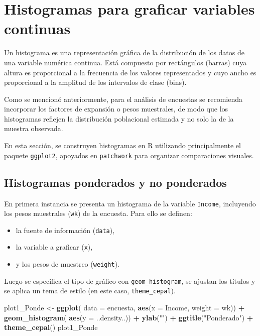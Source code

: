 \documentclass[
  12pt,
]{book}
\newenvironment{Shaded}{\begin{snugshade}}{\end{snugshade}}
\newcommand{\AttributeTok}[1]{\textcolor[rgb]{0.13,0.29,0.53}{#1}}
\newcommand{\FunctionTok}[1]{\textcolor[rgb]{0.13,0.29,0.53}{\textbf{#1}}}
\newcommand{\NormalTok}[1]{#1}
\newcommand{\OtherTok}[1]{\textcolor[rgb]{0.56,0.35,0.01}{#1}}
\newcommand{\SpecialCharTok}[1]{\textcolor[rgb]{0.81,0.36,0.00}{\textbf{#1}}}
\newcommand{\StringTok}[1]{\textcolor[rgb]{0.31,0.60,0.02}{#1}}
\providecommand{\tightlist}{%
  \setlength{\itemsep}{0pt}\setlength{\parskip}{0pt}}
\begin{document}
\section{Histogramas para graficar variables continuas}\label{histogramas-para-graficar-variables-continuas}

Un histograma es una representación gráfica de la distribución de los datos de una variable numérica continua. Está compuesto por rectángulos (barras) cuya altura es proporcional a la frecuencia de los valores representados y cuyo ancho es proporcional a la amplitud de los intervalos de clase (bins).

Como se mencionó anteriormente, para el análisis de encuestas se recomienda incorporar los factores de expansión o pesos muestrales, de modo que los histogramas reflejen la distribución poblacional estimada y no solo la de la muestra observada.

En esta sección, se construyen histogramas en R utilizando principalmente el paquete \texttt{ggplot2}, apoyados en \texttt{patchwork} para organizar comparaciones visuales.

\subsection{Histogramas ponderados y no ponderados}\label{histogramas-ponderados-y-no-ponderados}

En primera instancia se presenta un histograma de la variable \texttt{Income}, incluyendo los pesos muestrales (\texttt{wk}) de la encuesta. Para ello se definen:

\begin{itemize}
\tightlist
\item
  la fuente de información (\texttt{data}),
\item
  la variable a graficar (\texttt{x}),
\item
  y los pesos de muestreo (\texttt{weight}).
\end{itemize}

Luego se especifica el tipo de gráfico con \texttt{geom\_histogram}, se ajustan los títulos y se aplica un tema de estilo (en este caso, \texttt{theme\_cepal}).

\begin{Shaded}
\begin{Highlighting}[]
\NormalTok{plot1\_Ponde }\OtherTok{\textless{}{-}} \FunctionTok{ggplot}\NormalTok{(}
  \AttributeTok{data =}\NormalTok{ encuesta,              }
  \FunctionTok{aes}\NormalTok{(}\AttributeTok{x =}\NormalTok{ Income, }\AttributeTok{weight =}\NormalTok{ wk)) }\SpecialCharTok{+}
  \FunctionTok{geom\_histogram}\NormalTok{(               }
    \FunctionTok{aes}\NormalTok{(}\AttributeTok{y =}\NormalTok{ ..density..)) }\SpecialCharTok{+}        
  \FunctionTok{ylab}\NormalTok{(}\StringTok{""}\NormalTok{) }\SpecialCharTok{+}                   
  \FunctionTok{ggtitle}\NormalTok{(}\StringTok{"Ponderado"}\NormalTok{) }\SpecialCharTok{+}        
  \FunctionTok{theme\_cepal}\NormalTok{()  }
\NormalTok{plot1\_Ponde}
\end{Highlighting}
\end{Shaded}
\end{document}
